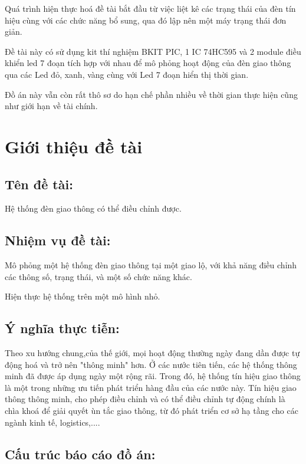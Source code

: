 \documentclass[a4paper]{article}
\begin{document}
Quá trình hiện thực hoá đề tài bắt đầu từ việc liệt kê các trạng thái của đèn tín hiệu cùng với các chức năng bổ sung, qua đó lập nên một máy trạng thái đơn giản.

Đề tài này có sử dụng kit thí nghiệm BKIT PIC, 1 IC 74HC595 và 2 module điều khiển led 7 đoạn tích hợp với nhau để mô phỏng hoạt động của đèn giao thông qua các Led đỏ, xanh, vàng cùng với Led 7 đoạn hiển thị thời gian.

Đồ án này vẫn còn rất thô sơ do hạn chế phần nhiều về thời gian thực hiện cũng như giới hạn về tài chính.
\newpage
\tableofcontents
\newpage
\listoffigures
\newpage



\section{Giới thiệu đề tài}
\subsection{Tên đề tài:}

Hệ thống đèn giao thông có thể điều chỉnh được.

\subsection{Nhiệm vụ đề tài:}

Mô phỏng một hệ thống đèn giao thông tại một giao lộ, với khả năng điều chỉnh các thông số, trạng thái, và một số chức năng khác.

Hiện thực hệ thống trên một mô hình nhỏ.

\subsection{Ý nghĩa thực tiễn:}

Theo xu hướng chung,của thế giới, mọi hoạt động thường ngày đang dần được tự động hoá và trở nên "thông minh" hơn. Ở các nước tiên tiến, các hệ thống thông minh đã được áp dụng ngày một rộng rãi. Trong đó, hệ thống tín hiệu giao thông là một trong những ưu tiến phát triển hàng đầu của các nước này. Tín hiệu giao thông thông minh, cho phép điều chỉnh và có thể điều chỉnh tự động chính là chìa khoá để giải quyết ùn tắc giao thông, từ đó phát triển cơ sở hạ tầng cho các ngành kinh tế, logistics,....

\subsection{Cấu trúc báo cáo đồ án:}
\end{document}
